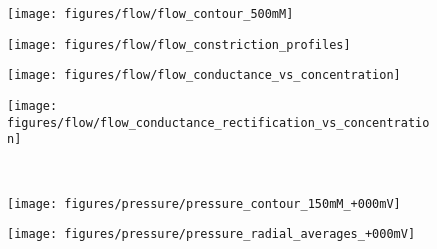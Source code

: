 \documentclass[twoside,twocolumn,9pt]{article}
\begin{document}
\begin{figure*}[!t]
  \centering
  \begin{minipage}[t]{5.5cm}
    \begin{subfigure}[t]{5.5cm}
      \centering
      \caption{}\vspace{-3mm}\label{fig:flow_contour}
      \texttt{[image: figures/flow/flow\_contour\_500mM]}
    \end{subfigure}
    \begin{subfigure}[t]{5.5cm}
      \vspace{3mm}
      \centering
      \caption{}\vspace{-3mm}\label{fig:flow_constriction_profiles}
      \texttt{[image: figures/flow/flow\_constriction\_profiles]}
    \end{subfigure}
  \end{minipage}
  \begin{minipage}[t]{11.5cm}
    \hspace{1cm}
    \begin{subfigure}[t]{5cm}
      \centering
      \caption{}\vspace{-3mm}\label{fig:flow_conductance_vs_concentration}
      \texttt{[image: figures/flow/flow\_conductance\_vs\_concentration]}
    \end{subfigure}
    \begin{subfigure}[t]{5cm}
      \centering
      \caption{}\vspace{-3mm}\label{fig:flow_conductance_rectification_vs_concentration}
      \texttt{[image: figures/flow/flow\_conductance\_rectification\_vs\_concentration]}
    \end{subfigure}
    \\
    \begin{minipage}[t]{10cm}
      \hspace{1cm}
      \begin{subfigure}[t]{5.5cm}
        \centering
        \caption{}\vspace{-3mm}\label{fig:pressure_contour}
        \texttt{[image: figures/pressure/pressure\_contour\_150mM\_+000mV]}
      \end{subfigure}
      \hspace{-5mm}
      \begin{subfigure}[t]{2.5cm}
        \centering
        \caption{}\vspace{-3mm}\label{fig:pressure_radial_averages}
        \texttt{[image: figures/pressure/pressure\_radial\_averages\_+000mV]}
      \end{subfigure}
    \end{minipage}
  \end{minipage}
\centering


\end{figure*}
\end{document}
